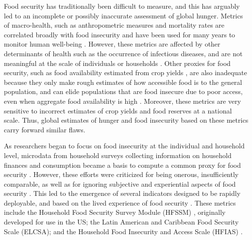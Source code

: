 \documentclass[titlepage]{article}
\begin{document}
Food security has traditionally been difficult to measure, and this has arguably led to an incomplete or possibly inaccurate assessment of global hunger. Metrics of macro-health, such as anthropometric measures and mortality rates are correlated broadly with food insecurity and have been used for many years to monitor human well-being \citep{Puffer1973, Habicht1974}.  However, these metrics are affected by other determinants of health such as the occurrence of infectious diseases, and are not meaningful at the scale of individuals or households \citep{Perumal2018}.  Other proxies for food security, such as food availability estimated from crop yields \citep{Maxwell1992}, are also inadequate because they only make rough estimates of how accessible food is to the general population, and can elide populations that are food insecure due to poor access, even when aggregate food availability is high \citep{Sen1983}.  Moreover, these metrics are very sensitive to incorrect estimates of crop yields and food reserves at a national scale.  Thus, global estimates of hunger and food insecurity based on these metrics carry forward similar flaws.

As researchers began to focus on food insecurity at the individual and household level, microdata from household surveys collecting information on household finances and consumption became a basis to compute a common proxy for food security \citep{Haddad1994}.  However, these efforts were criticized for being onerous, insufficiently comparable, as well as for ignoring subjective and experiential aspects of food security \citep{Maxwell1996}.  This led to the emergence of several indicators designed to be rapidly deployable, and based on the lived experience of food security \citep{Jones2013}.  These metrics include the Household Food Security Survey Module (HFSSM) \citep{kennedy2005keynote}, originally developed for use in the US; the Latin American and Caribbean Food Security Scale (ELCSA); and the Household Food Insecurity and Access Scale (HFIAS) \citep{Coates2007}.
\end{document}
